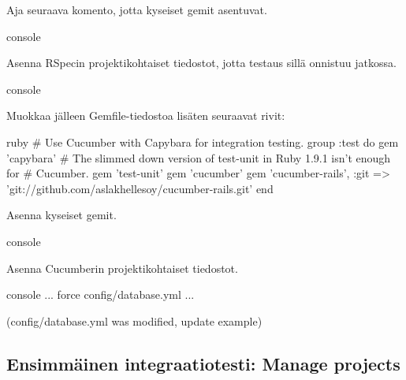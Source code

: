 \documentclass{article}
\newcommand{\pdfforeignlanguage}[2]{\texorpdfstring{\foreignlanguage{#1}{#2}}{#2}}
\newcommand{\eng}[1]{\pdfforeignlanguage{english}{#1}}
\begin{document}
\begin{samepage}
Aja seuraava komento, jotta kyseiset gemit asentuvat.

\begin{pygmented}{console}
\end{pygmented}
\end{samepage}

\begin{samepage}
Asenna RSpecin projektikohtaiset tiedostot, jotta testaus sillä onnistuu
jatkossa.

\begin{pygmented}{console}
\end{pygmented}
\end{samepage}

\begin{samepage}
Muokkaa jälleen Gemfile-tiedostoa lisäten seuraavat rivit:

\begin{pygmented}{ruby}
# Use Cucumber with Capybara for integration testing.
group :test do
  gem 'capybara'
  # The slimmed down version of test-unit in Ruby 1.9.1 isn't enough for
  # Cucumber.
  gem 'test-unit'
  gem 'cucumber'
  gem 'cucumber-rails', :git => 'git://github.com/aslakhellesoy/cucumber-rails.git'
end
\end{pygmented}
\end{samepage}

\begin{samepage}
Asenna kyseiset gemit.

\begin{pygmented}{console}
\end{pygmented}
\end{samepage}

\begin{samepage}
Asenna Cucumberin projektikohtaiset tiedostot.

\begin{pygmented}{console}
...
       force  config/database.yml
...

(config/database.yml was modified, update example)

\end{pygmented}
\end{samepage}

\subsection{Ensimmäinen integraatiotesti: \eng{Manage projects}}
\end{document}

